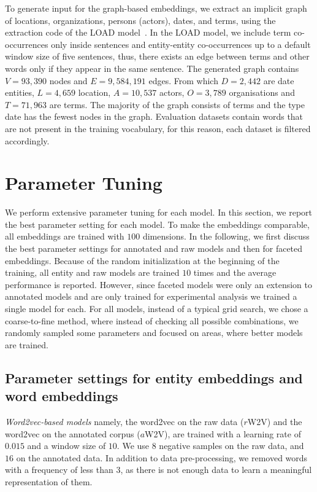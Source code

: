 To generate input for the graph-based embeddings, we extract an implicit graph of locations, organizations, persons (actors), dates, and terms, using the extraction code of the LOAD model~. In the LOAD model, we include term co-occurrences only inside sentences and entity-entity co-occurrences up to a default window size of five sentences, thus, there exists an edge between terms and other words only if they appear in the same sentence. The generated graph contains $V=93,390$ nodes and $E=9,584,191$ edges. From which $D=2,442$  are date entities, $L=4,659$ location, $A=10,537$ actors, $O=3,789$ organisations and $T=71,963$ are terms. The majority of the graph consists of terms and the type date has the fewest nodes in the graph. Evaluation datasets contain words that are not present in the training vocabulary, for this reason, each dataset is filtered accordingly.
\section{Parameter Tuning } \label{sec:setup}
We perform extensive parameter tuning for each model. In this section, we report the best parameter setting for each model. To make the embeddings comparable, all embeddings are trained with $100$ dimensions. In the following, we first discuss the best parameter settings for annotated and raw models and then for faceted embeddings. Because of the random initialization  at the beginning of the training, all entity and raw models are trained $10$ times and the average performance is reported. However, since faceted models were only an extension to annotated models and are only trained for experimental analysis we trained a single model for each. For all models, instead of a typical grid search, we chose a coarse-to-fine method, where instead of checking all possible combinations, we randomly sampled some parameters and focused on areas, where better models are trained.
\subsection{Parameter settings for entity embeddings and word embeddings}
 
\emph{Word2vec-based models} namely, the word2vec on the raw data ($r$W2V) and the word2vec on the annotated corpus ($a$W2V), are trained with a learning rate of $0.015$ and a window size of $10$. We use $8$ negative samples on the raw data, and $16$ on the annotated data. In addition to data pre-processing, we removed words with a frequency of less than $3$, as there is not enough data to learn a meaningful representation of them. \\

